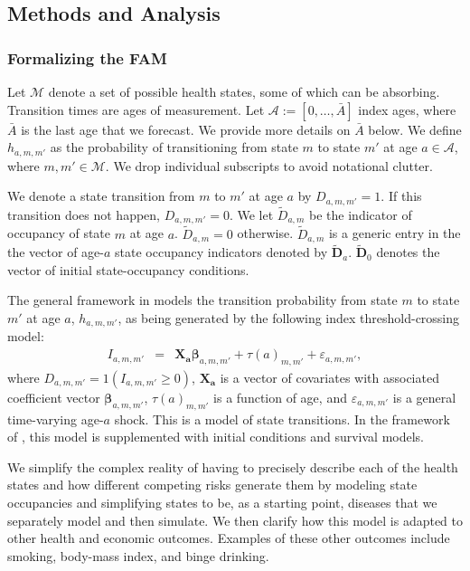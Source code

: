 \subsection{Methods and Analysis}

\subsubsection{Formalizing the FAM}
\label{section:transition_models}

Let $\mathcal{M}$ denote a set of possible health states, some of which can be absorbing. Transition times are ages of measurement. Let $\mathcal{A}:= [ 0, \ldots, \bar{A}]$ index ages, where $\bar{A}$ is the last age that we forecast. We provide more details on $\bar{A}$ below. We define $h_{a,m,m'}$ as the probability of transitioning from state $m$ to state $m'$ at age $a \in \mathcal{A}$, where $m, m' \in \mathcal{M}$. We drop individual subscripts to avoid notational clutter.

We denote a state transition from $m$ to $m'$ at age $a$ by $D_{a,m,m'} = 1$. If this transition does not happen,  $D_{a,m,m'} = 0$. We let $\tilde{D}_{a,m}$ be the indicator of occupancy of state $m$ at age $a$. $\tilde{D}_{a,m} = 0$ otherwise. $\tilde{D}_{a,m}$ is a generic entry in the the vector of age-$a$ state occupancy indicators denoted by $\tilde{\bm{D}}_a$. $\tilde{\bm{D}}_0$ denotes the vector of initial state-occupancy conditions.

The general framework in \citet{Heckman_1981_heterogeneity,Heckman_1981_IncidentalParametersProblem} models the transition probability from state $m$ to state $m'$ at age $a$, $h_{a,m,m'}$, as being generated by the following index threshold-crossing model:
\begin{eqnarray}
I_{a,m,m'} &=& \bm{X_a} \bm{\beta}_{a,m,m'} + \tau \left( a \right)_{m,m'} + \varepsilon_{a,m,m'}, \label{eq:trans0}
\end{eqnarray}
where $D_{a,m,m'} = \bm{\mathit{1}}  \left( I_{a,m,m'} \geq 0 \right)$, $\bm{X_a}$ is a vector of covariates with associated coefficient vector $ \bm{\beta}_{a,m,m'}$, $\tau \left( a \right)_{m,m'}$ is a function of age, and $\varepsilon_{a,m,m'}$ is a general time-varying age-$a$ shock. This is a model of state transitions. In the framework of  \citet{Heckman_1981_heterogeneity,Heckman_1981_IncidentalParametersProblem}, this model is supplemented with initial conditions and survival models.

We simplify the complex reality of having to precisely describe each of the health states and how different competing risks generate them by modeling state occupancies and simplifying states to be, as a starting point, diseases that we separately model and then simulate. We then clarify how this model is adapted to other health and economic outcomes. Examples of these other outcomes include smoking, body-mass index, and binge drinking.

